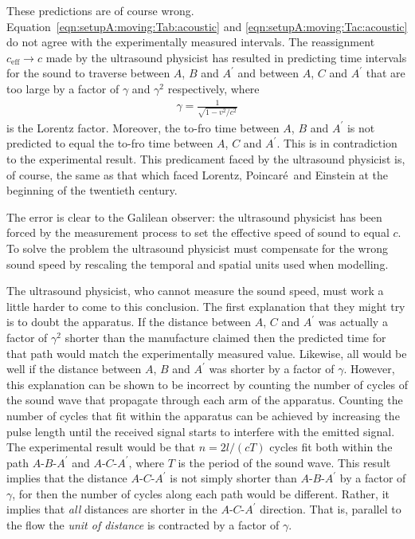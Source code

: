 \documentclass[10pt, fleqn,final,showtrims,oldfontcommands, article,a4paper,oneside]{memoir} %
\newcommand{\eqnref}[1]{\ref{eqn:#1}}
\newcommand{\lr}[1]{\left( #1 \right)}
\newcommand{\Poincare}{Poincar{\'e}}
\newcommand{\eff}{{\textrm{eff}}}
\begin{document}
These predictions are of course wrong.
Equation~\ref{eqn:setupA:moving:Tab:acoustic} and \ref{eqn:setupA:moving:Tac:acoustic} do not agree with the
experimentally measured intervals.
The reassignment $c_\eff \rightarrow c$ made by the ultrasound physicist 
has resulted in predicting time intervals for the sound to traverse between $A$, $B$ and $A^\prime$ and between $A$, $C$ and $A^\prime$ that are too large
by a factor of $\gamma$ and $\gamma^2$ respectively,
where 
\begin{align}
  \gamma = \frac{1}{\sqrt{1-v^2/c^2}}
  \label{eqn:gamma}
\end{align}
is the Lorentz factor.
Moreover, the to-fro time between $A$, $B$ and $A^\prime$ is not predicted to equal  the to-fro time between $A$, $C$ and $A^\prime$.
This is in contradiction to the experimental result.
This predicament faced by the ultrasound physicist  is, of course, the same as that which faced Lorentz, \Poincare\ and Einstein at the beginning  of the twentieth century.



The error is clear to the Galilean observer:
the ultrasound physicist has been forced by the measurement process to  set the effective speed of sound to equal $c$.
To solve the problem the ultrasound physicist  must  compensate for the wrong sound speed by rescaling the temporal and spatial units  used when modelling.

The ultrasound physicist, who cannot measure the sound speed,
must work a little harder to come to this conclusion.
The first explanation that they might try  is to doubt the apparatus.
If the distance between $A$, $C$ and $A^\prime$ was actually a factor of  $\gamma^2$ shorter than the manufacture claimed then the predicted time for that path would match the 
experimentally measured value.
Likewise, all would be well if the distance between $A$, $B$ and $A^\prime$ was shorter by a factor of $\gamma$.
However, this explanation can be shown to be incorrect by  counting  the number of cycles of the sound wave that propagate through each arm of the apparatus.
Counting the number of cycles that fit within the apparatus 
can be achieved by increasing the pulse length until the received signal starts to interfere with the emitted signal.
The experimental result would be that  $n = 2l/\lr{cT}$ cycles fit both  within the path  $A$-$B$-$A^\prime$  and $A$-$C$-$A^\prime$, where $T$ is the period of the sound wave.
This result implies that the distance $A$-$C$-$A^\prime$ is not simply shorter than $A$-$B$-$A^\prime$ by a factor of $\gamma$,
for then the number of cycles along each path would be different.
Rather, it implies that {\em all} distances are shorter in the $A$-$C$-$A^\prime$ direction.
That is, parallel to the flow the {\em   unit of distance} is contracted  by a factor of $\gamma$.
\end{document}
